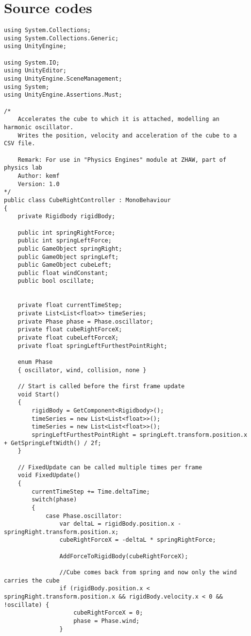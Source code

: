 \documentclass{article}
\begin{document}
\section{Source codes}
\begin{lstlisting}[caption={CubeRightController.cs}, label={CubeRightController}, basicstyle=\ttfamily\small]
using System.Collections;
using System.Collections.Generic;
using UnityEngine;

using System.IO;
using UnityEditor;
using UnityEngine.SceneManagement;
using System;
using UnityEngine.Assertions.Must;

/*
    Accelerates the cube to which it is attached, modelling an harmonic oscillator.
    Writes the position, velocity and acceleration of the cube to a CSV file.
    
    Remark: For use in "Physics Engines" module at ZHAW, part of physics lab
    Author: kemf
    Version: 1.0
*/
public class CubeRightController : MonoBehaviour
{
    private Rigidbody rigidBody;

    public int springRightForce;
    public int springLeftForce;
    public GameObject springRight;
    public GameObject springLeft;
    public GameObject cubeLeft;
    public float windConstant;
    public bool oscillate;


    private float currentTimeStep;
    private List<List<float>> timeSeries;
    private Phase phase = Phase.oscillator;
    private float cubeRightForceX;
    private float cubeLeftForceX;
    private float springLeftFurthestPointRight;

    enum Phase
    { oscillator, wind, collision, none }

    // Start is called before the first frame update
    void Start()
    {
        rigidBody = GetComponent<Rigidbody>();
        timeSeries = new List<List<float>>();
        timeSeries = new List<List<float>>();
        springLeftFurthestPointRight = springLeft.transform.position.x + GetSpringLeftWidth() / 2f;
    }

    // FixedUpdate can be called multiple times per frame
    void FixedUpdate()
    {
        currentTimeStep += Time.deltaTime;
        switch(phase)
        {
            case Phase.oscillator:
                var deltaL = rigidBody.position.x - springRight.transform.position.x;
                cubeRightForceX = -deltaL * springRightForce;
                
                AddForceToRigidBody(cubeRightForceX);

                //Cube comes back from spring and now only the wind carries the cube
                if (rigidBody.position.x < springRight.transform.position.x && rigidBody.velocity.x < 0 && !oscillate) {
                    cubeRightForceX = 0;
                    phase = Phase.wind;
                }


\end{lstlisting}
\end{document}
